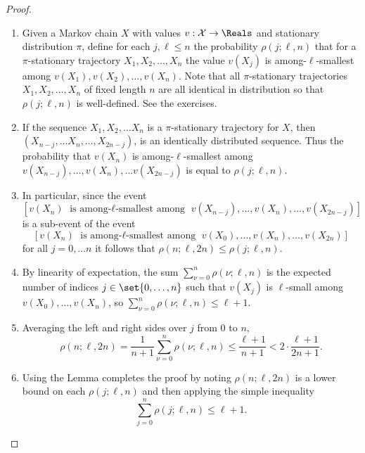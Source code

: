 \documentclass[12pt]{article}
\begin{document}
\begin{proof}
    \begin{enumerate}
        \item
            Given a Markov chain \( X \) with values \( v:  \mathcal{X}
            \to \Reals \) and stationary distribution \( \pi \), define
            for each \( j, \ell \le n \) the probability \( \rho(j; \ell,
            n) \) that for a \( \pi \)-stationary trajectory \( X_1, X_2,
            \dots, X_n \) the value \( v(X_j) \) is among-\( \ell \)-smallest
            among \( v(X_1), v(X_2), \dots, v(X_n) \). Note that all \(
            \pi \)-stationary trajectories \( X_1, X_2, \dots, X_n \) of
            fixed length \( n \) are all identical in distribution so
            that \( \rho(j; \ell, n) \) is well-defined. See the
            exercises.
        \item
            If the sequence \( X_1, X_2, \dots X_n \) is a \(
            \pi \)-stationary trajectory for \( X \), then \( (X_{n-j},
            \dots X_n, \dots, X_{2n-j}) \), is an identically
            distributed sequence.  Thus the probability that \( v(X_n) \)
            is among-\( \ell \)-smallest among \( v(X_{n-j}), \dots, v(X_n),
            \dots v(X_{2n-j}) \) is equal to \( \rho(j; \ell, n) \).  
          \item In
            particular, since the event
            \[
                [v(X_n) \text{ is among-$\ell$-smallest among } v(X_
                {n-j}), \dots, v(X_n), \dots, v(X_{2n-j})]
            \] is a sub-event of the event
            \[
                [v(X_n) \text{ is among-$\ell$-smallest among } v(X_0),
                \dots, v(X_n), \dots, v(X_{2n})]
            \] for all \( j = 0, \dots n \) it follows that \( \rho(n;
            \ell, 2n) \le \rho(j; \ell, n) \).
        \item
            By linearity of expectation, the sum \( \sum_{\nu=0}^n \rho(
            \nu; \ell, n) \) is the expected number of indices \( j \in
            \set{0, \dots, n} \) such that \( v(X_j) \) is \( \ell \)-small
            among \( v(X_0), \dots, v(X_n) \), so \( \sum_{\nu=0}^n \rho
            (\nu; \ell, n) \le \ell + 1 \).
        \item
            Averaging the left and right sides over \( j \) from \( 0 \)
            to \( n \),
            \[
                \rho(n; \ell, 2n) = \frac{1}{n+1} \sum_{\nu=0}^n \rho(\nu;
                \ell, n) \le \frac{\ell + 1}{n+1} < 2 \cdot \frac{\ell+1}
                {2n+1}.
            \]
        \item
            Using the Lemma completes the proof by noting \( \rho(n; \ell,
            2n) \) is a lower bound on each \( \rho(j; \ell, n) \) and
            then applying the simple inequality
            \begin{equation}
                \label{eq:parallelsignificance:eight} \sum\limits_{j=0}^n \rho(j;
                \ell, n) \le \ell + 1.
            \end{equation}
    \end{enumerate}
\end{proof}
\end{document}
